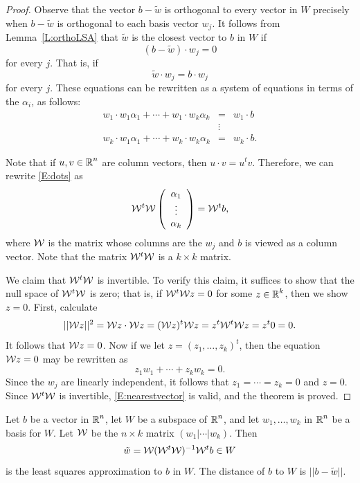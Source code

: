 \documentclass{ximera}
\begin{document}
\begin{proof} Observe that the vector $b - \tilde{w}$ is orthogonal to every vector in $W$
precisely when $b-\tilde{w}$ is orthogonal to each basis vector $w_j$.  It
follows from Lemma~\ref{L:orthoLSA} that $\tilde{w}$ is the closest vector to $b$
in $W$ if
\[
(b - \tilde{w})\cdot w_j = 0
\]
for every $j$.  That is, if
\[
\tilde{w} \cdot w_j = b \cdot w_j
\]
for every $j$.  These equations can be rewritten as a system of equations in
terms of the $\alpha_i$, as follows:
\begin{equation}  \label{E:dots}
 \begin{array}{ccc}
w_1\cdot w_1\alpha_1 + \cdots + w_1\cdot w_k\alpha_k & = & w_1\cdot b\\
 & \vdots &  \\
w_k\cdot w_1\alpha_1 + \cdots + w_k\cdot w_k\alpha_k & = & w_k\cdot b.
\end{array}
\end{equation}

Note that if $u,v\in\mbox{$\mathbb{R}$}^n$ are column vectors, then $u\cdot v= u^tv$. Therefore,
we can rewrite \eqref{E:dots} as
\[
\mathcal{W}^t\mathcal{W} \left(\begin{array}{c} \alpha_1\\ \vdots \\ \alpha_k \end{array}\right) =
\mathcal{W}^t b,
\]
where $\mathcal{W}$ is the matrix whose columns are the $w_j$ and $b$ is viewed as a
column vector.  Note that the matrix $\mathcal{W}^t\mathcal{W}$ is a $k\times k$ matrix.

We claim that $\mathcal{W}^t\mathcal{W}$ is invertible.  To verify this claim, it suffices to
show that the null space
of $\mathcal{W}^t\mathcal{W}$ is zero; that is, if $\mathcal{W}^t\mathcal{W} z = 0$ for some
$z\in\mbox{$\mathbb{R}$}^k$, then we show $z=0$.  First, calculate
\[
||\mathcal{W} z||^2 = \mathcal{W} z\cdot \mathcal{W} z = (\mathcal{W} z)^t\mathcal{W} z = z^t\mathcal{W}^t\mathcal{W} z= z^t0 = 0.
\]
It follows that $\mathcal{W} z=0$.  Now if we let $z=(z_1,\ldots,z_k)^t$, then the
equation $\mathcal{W} z=0$ may be rewritten as
\[
z_1w_1 + \cdots + z_kw_k = 0.
\]
Since the $w_j$ are linearly independent, it follows that $z_1 = \cdots = z_k =0$   
and $z=0$.  Since $\mathcal{W}^t\mathcal{W} $ is invertible, \eqref{E:nearestvector} is
valid, and the theorem is proved. 
\end{proof}

\begin{corollary} \label{C:nearestvector}
Let $b$ be a vector in $\mbox{$\mathbb{R}$}^n$, let $W$ be a subspace of $\mbox{$\mathbb{R}$}^n$, and
let $w_1,\ldots,w_k$ in $\mbox{$\mathbb{R}$}^n$ be a basis for $W$.
Let $\mathcal{W} $ be the $n\times k$ matrix $(w_1|\cdots| w_k)$.  Then 
\begin{equation} \label{C:w_0_formula}
\tilde{w} =  \mathcal{W} (\mathcal{W}^t\mathcal{W} )^{-1} \mathcal{W}^t b \in W
\end{equation}
 is the least squares approximation to $b$ in $W$.  The distance of 
 $b$ to $W$ is $|| b - \tilde{w} ||$.
\end{corollary}
\end{document}
